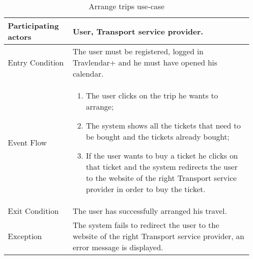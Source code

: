 \begin{table}[H]
	\begin{center}
		\begin{tabular}{ | p{} | p{} | }
		\hline
		Participating actors &  User, Transport service provider.\\
		\hline
		Entry Condition & The user must be registered, logged in Travlendar+ and he must have opened his calendar.\\
		\hline
		Event Flow & 
			\begin{enumerate}
				\item The user clicks on the trip he wants to arrange;
				\item The system shows all the tickets that need to be bought and the tickets already bought;
				\item If the user wants to buy a ticket he clicks on that ticket and the system redirects the user to the website of the right Transport service provider in order to buy the ticket.
			\end{enumerate} \\
		\hline
		Exit Condition & The user has successfully arranged his travel. \\
		\hline
		Exception & The system fails to redirect the user to the website of the right Transport service provider, an error message is displayed.\\ 
		\hline
		\end{tabular}
	\end{center}
	\caption{Arrange trips use-case}
\end{table}